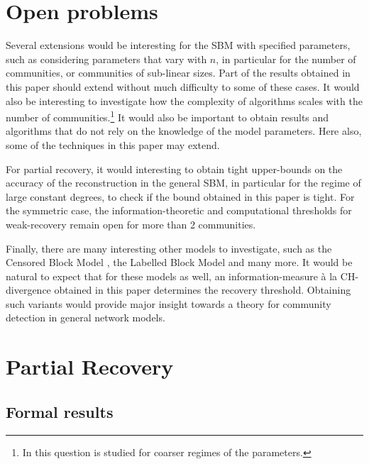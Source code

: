 \documentclass[11pt]{article}
\newcommand{\1}{\mathbb{1}}
\begin{document}


\section{Open problems}
Several extensions would be interesting for the SBM with specified parameters, such as considering parameters that vary with $n$, in particular for the number of communities, or communities of sub-linear sizes. Part of the results obtained in this paper should extend without much difficulty to some of these cases. It would also be interesting to investigate how the complexity of algorithms scales with the number of communities.\footnote{In \cite{chen-xu} this question is studied for coarser regimes of the parameters.} It would also be important to obtain results and algorithms that do not rely on the knowledge of the model parameters. Here also, some of the techniques in this paper may extend. 

For partial recovery, it would interesting to obtain tight upper-bounds on the accuracy of the reconstruction in the general SBM, in particular for the regime of large constant degrees, to check if the bound obtained in this paper is  tight. For the symmetric case, the information-theoretic and computational thresholds for weak-recovery remain open for more than 2 communities. 

Finally, there are many interesting other models to investigate, such as the Censored Block Model \cite{random,abbs,abbs-isit,abbetoc,Huang_Guibas_Graphics,Chen_Huang_Guibas_Graphics,Chen_Goldsmith_ISIT2014,rough}, the Labelled Block Model \cite{label_marc,jiaming} and many more. It would be natural to expect that for these models as well, an information-measure \`a la CH-divergence obtained in this paper determines the recovery threshold. Obtaining such variants would provide major insight towards a theory for community detection in general network models.  



\section{Partial Recovery}\label{partial-sec}
\subsection{Formal results}
\end{document}
